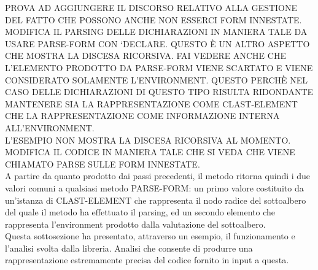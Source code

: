 PROVA AD AGGIUNGERE IL DISCORSO RELATIVO ALLA GESTIONE DEL FATTO CHE POSSONO
ANCHE NON ESSERCI FORM INNESTATE.\\

MODIFICA IL PARSING DELLE DICHIARAZIONI IN MANIERA TALE DA USARE PARSE-FORM
CON ‘DECLARE. QUESTO È UN ALTRO ASPETTO CHE MOSTRA LA DISCESA RICORSIVA. FAI
VEDERE ANCHE CHE L’ELEMENTO PRODOTTO DA PARSE-FORM VIENE SCARTATO E VIENE
CONSIDERATO SOLAMENTE L’ENVIRONMENT. QUESTO PERCHÈ NEL CASO DELLE
DICHIARAZIONI DI QUESTO TIPO RISULTA RIDONDANTE MANTENERE SIA LA
RAPPRESENTAZIONE COME CLAST-ELEMENT CHE LA RAPPRESENTAZIONE COME INFORMAZIONE
INTERNA ALL’ENVIRONMENT.\\

L’ESEMPIO NON MOSTRA LA DISCESA RICORSIVA AL MOMENTO. MODIFICA IL CODICE IN
MANIERA TALE CHE SI VEDA CHE VIENE CHIAMATO PARSE SULLE FORM INNESTATE.\\

A partire da quanto prodotto dai passi precedenti, il metodo ritorna quindi i
due valori comuni a qualsiasi metodo PARSE-FORM: un primo valore costituito da
un’istanza di CLAST-ELEMENT che rappresenta il nodo radice del sottoalbero del
quale il metodo ha effettuato il parsing, ed un secondo elemento che
rappresenta l’environment prodotto dalla valutazione del sottoalbero.\\

Questa sottosezione ha presentato, attraverso un esempio, il funzionamento e
l’analisi svolta dalla libreria. Analisi che consente di produrre una
rappresentazione estremamente precisa del codice fornito in input a questa.
